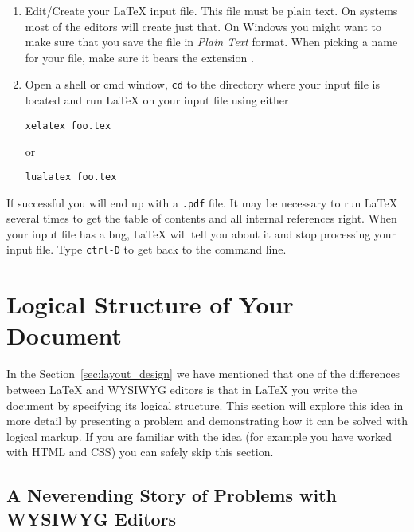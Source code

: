 \begin{enumerate}
  \item Edit/Create your \LaTeX{} input file. This file must be plain text.  On
        \Unix{} systems most of the editors will create just that. On Windows
        you might want to make sure that you save the file in \emph{Plain Text}
        format. When picking a name for your file, make sure it bears the
        extension .

  \item Open a shell or cmd window, \texttt{cd} to the directory where your
        input file is located and run \LaTeX{} on your input file using either
        \begin{lscommand}
          \verb+xelatex foo.tex+
        \end{lscommand}
        or
        \begin{lscommand}
          \verb+lualatex foo.tex+
        \end{lscommand}
\end{enumerate}

If successful you will end up with a \texttt{.pdf} file. It may be necessary to
run \LaTeX{} several times to get the table of contents and all internal
references right. When your input file has a bug, \LaTeX{} will tell you about
it and stop processing your input file. Type \texttt{ctrl-D} to get back to the
command line.

\section{Logical Structure of Your Document}

In the Section~\ref{sec:layout_design} we have mentioned that one of the
differences between \LaTeX{} and WYSIWYG editors is that in \LaTeX{} you write
the document by specifying its logical structure. This section will explore
this idea in more detail by presenting a problem and demonstrating how it can be
solved with logical markup. If you are familiar with the idea (for example you
have worked with HTML and CSS) you can safely skip this section.

\subsection{A Neverending Story of Problems with WYSIWYG Editors}

